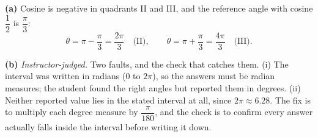 \documentclass[12pt]{article}
\begin{document}

\textbf{(a)} Cosine is negative in quadrants II and III, and the reference angle with cosine $\dfrac{1}{2}$ is $\dfrac{\pi}{3}$:
\[ \theta = \pi - \frac{\pi}{3} = \frac{2\pi}{3} \quad\text{(II)}, \qquad \theta = \pi + \frac{\pi}{3} = \frac{4\pi}{3} \quad\text{(III)}. \]

\textbf{(b)} \emph{Instructor-judged.} Two faults, and the check that catches them. (i) The interval was written in radians ($0$ to $2\pi$), so the answers must be radian measures; the student found the right angles but reported them in degrees. (ii) Neither reported value lies in the stated interval at all, since $2\pi \approx 6.28$. The fix is to multiply each degree measure by $\dfrac{\pi}{180}$, and the check is to confirm every answer actually falls inside the interval before writing it down.
\end{document}
